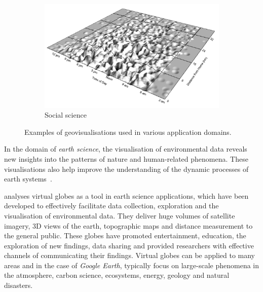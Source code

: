 {\begin{figure}[H]
\begin{subfigure}[b]{\applicationwidth}
        \end{subfigure}
        \begin{subfigure}[b]{\applicationwidth}
            \includegraphics[width=\textwidth,height=\applicationheight]{images/literature/social-science}
            	\caption{Social science \parencite{kwan2004geovisualization}}
            \label{fig:social_science}
        \end{subfigure}
		\caption{Examples of geovisualisations used in various application domains.}
		\subfigcaptionskip
		\label{fig:geovisualisation_applications}
	\end{figure}


	In the domain of \emph{earth science}, the visualisation of environmental data reveals new insights into the patterns of nature and human-related phenomena. These visualisations also help improve the understanding of the dynamic processes of earth systems~\parencite{yu2012google}.

	\textcite{yu2012google} analyses virtual globes as a tool in earth science applications, which have been developed to effectively facilitate data collection, exploration and the visualisation of environmental data. They deliver huge volumes of satellite imagery, 3D views of the earth, topographic maps and distance measurement to the general public. These globes have promoted entertainment, education, the exploration of new findings, data sharing and provided researchers with effective channels of communicating their findings. Virtual globes can be applied to many areas and in the case of \emph{Google Earth}, typically focus on large-scale phenomena in the atmosphere, carbon science, ecosystems, energy, geology and natural disasters.

}
